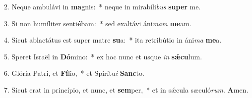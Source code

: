 2. Neque ambulávi in \textbf{ma}gnis:~*  neque in mirabíli\textit{bus} \textbf{su}\textbf{per} me.\

3. Si non humíliter senti\textbf{é}bam:~*  sed exaltávi áni\textit{mam} \textbf{me}am.\

4. Sicut ablactátus est super matre \textbf{su}a:~*  ita retribútio in áni\textit{ma} \textbf{me}a.\

5. Speret Israël in \textbf{Dó}mino:~*  ex hoc nunc et usque \textit{in} \textbf{sǽ}\textbf{cu}lum.\

6. Glória Patri, et \textbf{Fí}lio,~*  et Spirítu\textit{i} \textbf{Sanc}to.\

7. Sicut erat in princípio, et nunc, et \textbf{sem}per,~*  et in sǽcula sæculó\textit{rum}. \textbf{A}men.\

